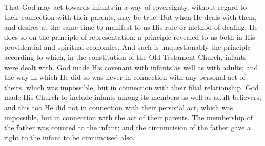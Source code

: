 \documentclass[
  english,
]{book}
\begin{document}
That God may act towards infants in a way of sovereignty, without regard to their connection with their parents, may be true. But when He deals with them, and desires at the same time to manifest to us His rule or method of dealing, He does so on the principle of representation; a principle revealed to us both in His providential and spiritual economies. And such is unquestionably the principle according to which, in the constitution of the Old Testament Church, infants were dealt with. God made His covenant with infants as well as with adults; and the way in which He did so was never in connection with any personal act of theirs, which was impossible, but in connection with their filial relationship. God made His Church to include infants among its members as well as adult believers; and this too He did not in connection with their personal act, which was impossible, but in connection with the act of their parents. The membership of the father was counted to the infant; and the circumcision of the father gave a right to the infant to be circumcised also.
\end{document}
